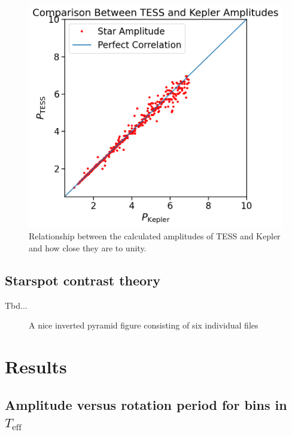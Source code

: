 \documentclass[twocolumn]{aastex631}
\begin{document}
\begin{figure}[!htb]
  \centering
  \includegraphics[scale=0.5]{Comparison Between TESS and Kepler Amplitudes.png}
  \caption{Relationship between the calculated amplitudes of TESS and Kepler and how close they are to unity.}
\end{figure}
\FloatBarrier


\subsection{Starspot contrast theory}
Tbd...

\begin{figure}
  \gridline
  {
    {}
    {}}
  \caption{A nice inverted pyramid figure
    consisting of six individual files}
\end{figure}

\section{Results}

\subsection{Amplitude versus rotation period for bins in $T_{\mathrm{eff}}$}
\end{document}
